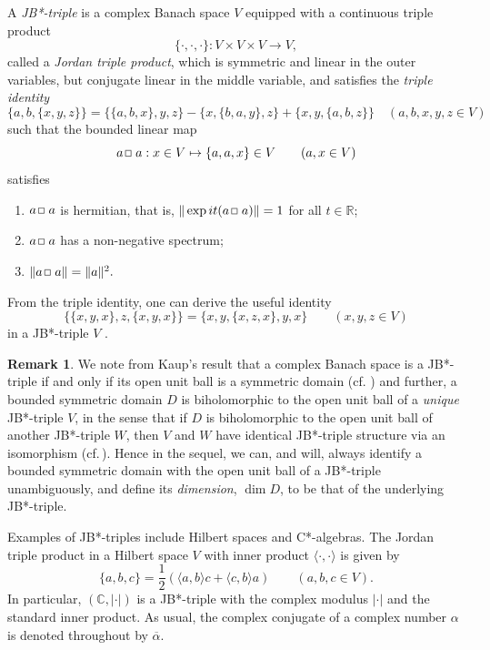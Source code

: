 \documentclass[12pt, twoside]{article}
\def\sqr#1#2{{\,\vcenter{\vbox{\hrule height.#2pt\hbox{\vrule width.#2pt
height#1pt \kern#1pt\vrule width.#2pt}\hrule height.#2pt}}\,}}
\def\bo{\sqr44\,}
\theoremstyle{definition}
\newtheorem*{xrem}{Remark}
\numberwithin{equation}{section}
\begin{document}
A {\it JB*-triple} is a complex Banach space $V$ equipped with
 a continuous triple product
$$\{\cdot,\cdot,\cdot\} : V\times V \times V \longrightarrow V,$$
called a {\it Jordan triple product}, which is symmetric and linear in the outer variables, but conjugate linear in the
middle variable, and satisfies the {\it triple identity}
$$\{a,b,\{x,y,z\}\} = \{\{a,b,x\},y,z\}- \{x, \{b,a,y\}, z\} + \{x,y,\{a,b,z\}\} \quad (a,b,x,y,z \in V)$$
such that the bounded linear map
$$a\bo a: x\in V\mapsto  \{a,a,x\} \in V \qquad (a, x\in V)$$
satisfies
\begin{enumerate}
\item[(i)] $a\bo a$ is hermitian, that is,
$\|\exp it(a\bo a)\|=1$ for all $t \in \mathbb{R}$;
\item[(ii)]
$a\bo a$ has a non-negative spectrum;
\item[(iii)] $\|a\bo a\|=\|a\|^2 .$
\end{enumerate}

From the triple identity, one can derive the  useful identity
\begin{equation}\label{jp1}
\{\{x,y,x\}, z, \{x,y,x\}\} = \{x,y,\{x,z,x\},y,x\} \qquad (x,y,z \in V)
\end{equation}
in a JB*-triple $V$  \cite[Lemma 1.2.4]{book}.

\begin{xrem}  We note from  Kaup's result that a complex Banach space is a JB*-triple if and only if its open unit ball
is a symmetric domain  (cf. \cite[Theorem 2.5.27]{book}) and further, a bounded symmetric domain $D$ is biholomorphic
to the open unit ball of a {\it unique} JB*-triple $V$, in the sense that if $D$ is biholomorphic to the open
unit ball of another JB*-triple $W$, then $V$ and $W$ have identical JB*-triple structure via an isomorphism
(cf.\,\cite[p.\,176]{book2}). Hence in the sequel, we can, and will,
always identify a bounded symmetric domain with the open unit ball of a JB*-triple
unambiguously, and define its {\it dimension}, $\dim D$, to be that of the underlying JB*-triple.
\end{xrem}

Examples of JB*-triples include Hilbert spaces and C*-algebras. The Jordan
triple product in a Hilbert space $V$ with inner product $\langle \cdot,\cdot\rangle$  is given by
$$\{a,b,c\} = \frac{1}{2}(\langle a,b \rangle c +\langle c, b\rangle a) \qquad (a,b,c \in V).$$
In particular, $(\mathbb{C}, |\cdot|)$ is a JB*-triple with the complex modulus $|\cdot|$
and the standard inner product. As usual,  the complex conjugate of a complex number $\alpha$ is denoted
throughout by $\overline \alpha$.
\end{document}
